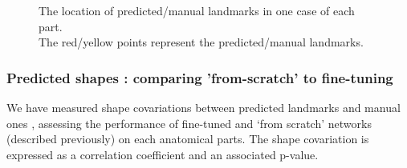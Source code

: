 \documentclass[review]{elsarticle}
\begin{document}
\begin{figure}[h!]
    \centering
    \caption{The location of predicted/manual landmarks in one case of each part.\\The red/yellow points represent the predicted/manual landmarks.}
    \label{figpdl}
\end{figure}
\subsubsection{Predicted shapes : comparing 'from-scratch' to fine-tuning}

We have measured shape covariations between predicted landmarks and manual ones \cite{rohlf_use_2000}, assessing the performance of fine-tuned and `from scratch' networks (described previously) on each anatomical parts. The shape covariation is expressed as a correlation coefficient and an associated p-value.
\end{document}
